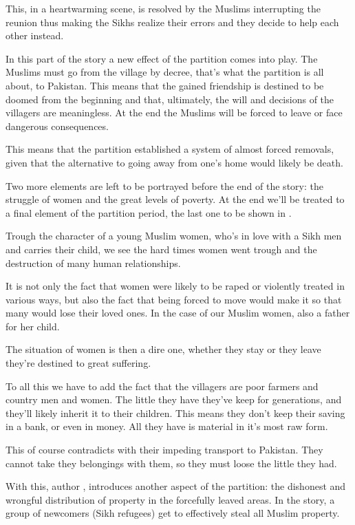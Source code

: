 \documentclass{scrartcl}
\begin{document}
This, in a heartwarming scene, is resolved
by the Muslims interrupting the reunion
thus making the Sikhs realize their errors
and they decide to help each other instead.

In this part of the story a new effect of the
partition comes into play.
The Muslims must go from the village by decree,
that's what the partition is all about,
to Pakistan.
This means that the gained friendship is destined
to be doomed from the beginning
and that, ultimately,
the will and decisions of the villagers are meaningless.
At the end the Muslims will be forced to leave or
face dangerous consequences.

This means that the partition established a system
of almost forced removals, given that the alternative
to going away from one's home would likely be death.

Two more elements are left to be portrayed
before the end of the story:
the struggle of women and the great levels of poverty.
At the end we'll be treated to a final element of the partition
period, the last one to be shown in \tpak.

Trough the character of a young Muslim women,
who's in love with a Sikh men and carries their child,
we see the hard times women went trough and
the destruction of many human relationships.

It is not only the fact that women were
likely to be raped or violently treated in various ways,
but also the fact that being forced to move would
make it so that many would lose their loved ones.
In the case of our Muslim women, also a father for her child.

The situation of women is then a dire one,
whether they stay or they leave they're destined
to great suffering.

To all this we have to add the fact that the villagers
are poor farmers and country men and women.
The little they have they've keep for generations,
and they'll likely inherit it to their children.
This means they don't keep their saving in a bank,
or even in money.
All they have is material in it's most raw form.

This of course contradicts with their impeding
transport to Pakistan.
They cannot take they belongings with them,
so they must loose the little they had.

With this, author \ks, introduces another aspect of
the partition: the dishonest and wrongful distribution
of property in the forcefully leaved areas.
In the story, a group of newcomers (Sikh refugees)
get to effectively steal all Muslim property.
\end{document}
